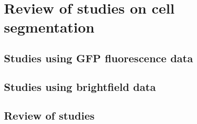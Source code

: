 \section{Review of studies on cell segmentation}

\subsection{Studies using GFP fluorescence data}

\subsection{Studies using brightfield data}

\subsection{Review of studies}
